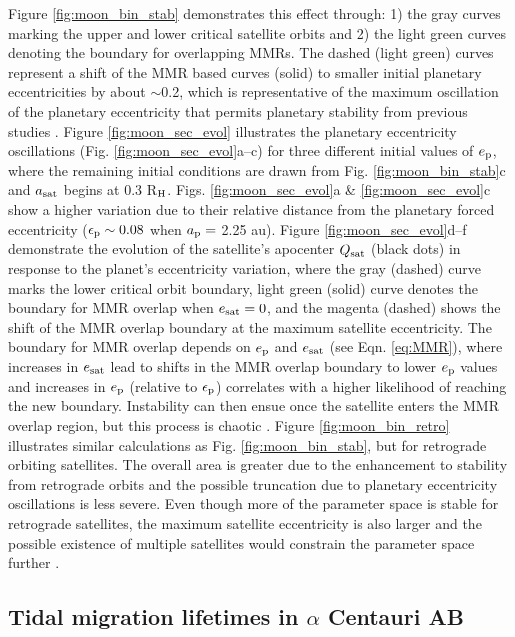 \documentclass[preprint]{aastex63}
\begin{document}
Figure \ref{fig:moon_bin_stab} demonstrates this effect through: 1) the gray curves marking the upper and lower critical satellite orbits and 2) the light green curves denoting the boundary for overlapping MMRs.  The dashed (light green) curves represent a shift of the MMR based curves (solid) to smaller initial planetary eccentricities by about $\sim$0.2, which is representative of the maximum oscillation of the planetary eccentricity that permits planetary stability from previous studies \citep{Quarles2016,Quarles2018}. {Figure \ref{fig:moon_sec_evol} illustrates the planetary eccentricity oscillations (Fig. \ref{fig:moon_sec_evol}a--c) for three different initial values of $e_{\rm p}$, where the remaining initial conditions are drawn from Fig. \ref{fig:moon_bin_stab}c and $a_{\rm sat}$ begins at 0.3 R$_{\rm H}$.  Figs. \ref{fig:moon_sec_evol}a \& \ref{fig:moon_sec_evol}c show a higher variation due to their relative distance from the planetary forced eccentricity ($\epsilon_{\rm p} \sim 0.08$ when $a_{\rm p} =$ 2.25 au).  Figure \ref{fig:moon_sec_evol}d--f demonstrate the evolution of the satellite's apocenter $Q_{\rm sat}$ (black dots) in response to the planet's eccentricity variation, where the gray (dashed) curve marks the lower critical orbit boundary, light green (solid) curve denotes the boundary for MMR overlap when $e_{\rm sat}= 0$, and the magenta (dashed) shows the shift of the MMR overlap boundary at the maximum satellite eccentricity.  The boundary for MMR overlap depends on $e_{\rm p}$ and $e_{\rm sat}$ (see Eqn. \ref{eq:MMR}), where increases in $e_{\rm sat}$ lead to shifts in the MMR overlap boundary to lower $e_{\rm p}$ values  and increases in $e_{\rm p}$ (relative to $\epsilon_{\rm p}$) correlates with a higher likelihood of reaching the new boundary.  Instability can then ensue once the satellite enters the MMR overlap region, but this process is chaotic \citep{Mudryk2006}.}  Figure \ref{fig:moon_bin_retro} illustrates similar calculations as Fig. \ref{fig:moon_bin_stab}, but for retrograde orbiting satellites.  The overall area is greater due to the enhancement to stability from retrograde orbits and the possible truncation due to planetary eccentricity oscillations is less severe.  Even though more of the parameter space is stable for retrograde satellites, the maximum satellite eccentricity is also larger and the possible existence of multiple satellites would constrain the parameter space further \citep{Giuppone2013}.

\subsection{Tidal migration lifetimes in $\alpha$ Centauri AB} \label{sec:tides}
\end{document}
